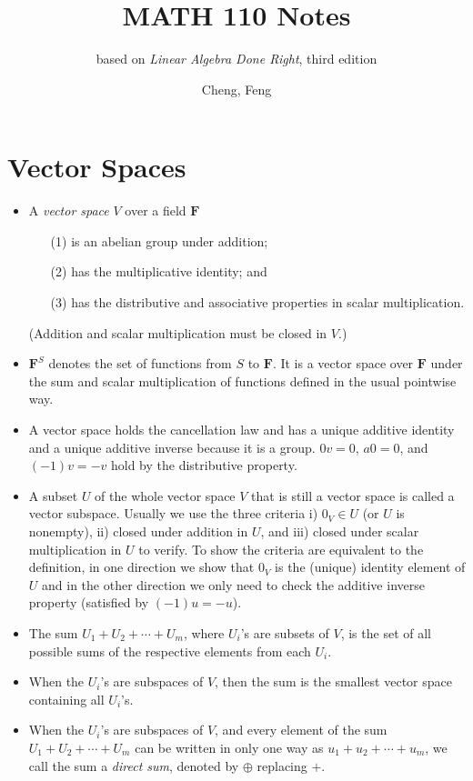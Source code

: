 \documentclass[11pt]{article}
\title{MATH 110 Notes}
\author{Cheng, Feng}
\subtitle{based on \textit{Linear Algebra Done Right}, third edition}
\date{}
\newcommand{\df}[1]{\textit{\textsf{#1}}}
\newcommand{\F}{\mathbf{F}}
\begin{document}
\maketitle

\tableofcontents
\newpage

\section{Vector Spaces}
\begin{itemize}
    \item A \df{vector space} $V$ over a field $\F$
    \begin{enumerate}
    \item [(1)] is an abelian group under addition;
    \item [(2)] has the multiplicative identity; and
    \item [(3)] has the distributive and associative properties in scalar multiplication.
    \end{enumerate}
    (Addition and scalar multiplication must be closed in $V$.)
    \item $\F^S$ denotes the set of functions from $S$ to $\F$. It is a vector space over $\F$ under the sum and scalar multiplication of functions defined in the usual pointwise way.
    \item A vector space holds the cancellation law and has a unique additive identity and a unique additive inverse because it is a group. $0v = 0$, $a0 = 0$, and $(-1)v = -v$ hold by the distributive property.
    \item A subset $U$ of the whole vector space $V$ that is still a vector space is called a vector subspace. Usually we use the three criteria i) $0_V \in U$ (or $U$ is nonempty), ii) closed under addition in $U$, and iii) closed under scalar multiplication in $U$ to verify. To show the criteria are equivalent to the definition, in one direction we show that $0_V$ is the (unique) identity element of $U$ and in the other direction we only need to check the additive inverse property (satisfied by $(-1)u = -u$).
    \item The sum $U_1 + U_2 +\cdots+ U_m$, where $U_i$'s are subsets of $V$, is the set of all possible sums of the respective elements from each $U_i$.
    \item When the $U_i$'s are subspaces of $V$, then the sum is the smallest vector space containing all $U_i$'s.
    \item When the $U_i$'s are subspaces of $V$, and every element of the sum $U_1 + U_2 +\cdots+ U_m$ can be written in only one way as $u_1+u_2+\cdots+u_m$, we call the sum a \df{direct sum}, denoted by $\oplus$ replacing $+$.

\end{itemize}
\end{document}

